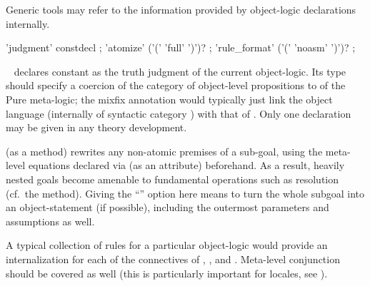 \begin{isabellebody}
\begin{isamarkuptext}
  Generic tools may refer to the information provided by object-logic
  declarations internally.

  \begin{rail}
    'judgment' constdecl
    ;
    'atomize' ('(' 'full' ')')?
    ;
    'rule\_format' ('(' 'noasm' ')')?
    ;
  \end{rail}

  \begin{descr}
  
  \item [\hyperlink{command.judgment}{\mbox{\isa{\isacommand{judgment}}}}~\isa{{\isachardoublequote}c\ {\isacharcolon}{\isacharcolon}\ {\isasymsigma}\ {\isacharparenleft}mx{\isacharparenright}{\isachardoublequote}}] declares
  constant  as the truth judgment of the current
  object-logic.  Its type \isa{{\isasymsigma}} should specify a coercion of the
  category of object-level propositions to  of the Pure
  meta-logic; the mixfix annotation  would typically
  just link the object language (internally of syntactic category
  ) with that of .  Only one \hyperlink{command.judgment}{\mbox{}} declaration may be given in any theory development.
  
  \item [\hyperlink{method.atomize}{\mbox{\isa{atomize}}} (as a method)] rewrites any non-atomic
  premises of a sub-goal, using the meta-level equations declared via
  \hyperlink{attribute.atomize}{\mbox{}} (as an attribute) beforehand.  As a result,
  heavily nested goals become amenable to fundamental operations such
  as resolution (cf.\ the \hyperlink{method.rule}{\mbox{}} method).  Giving the ``'' option here means to turn the whole subgoal into an
  object-statement (if possible), including the outermost parameters
  and assumptions as well.

  A typical collection of \hyperlink{attribute.atomize}{\mbox{}} rules for a particular
  object-logic would provide an internalization for each of the
  connectives of \isa{{\isachardoublequote}{\isasymAnd}{\isachardoublequote}}, \isa{{\isachardoublequote}{\isasymLongrightarrow}{\isachardoublequote}}, and \isa{{\isachardoublequote}{\isasymequiv}{\isachardoublequote}}.
  Meta-level conjunction should be covered as well (this is
  particularly important for locales, see ).


\end{descr}
\end{isamarkuptext}
\end{isabellebody}
